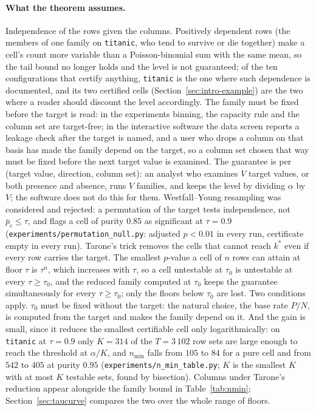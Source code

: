 \documentclass[11pt]{article}
\begin{document}
\paragraph{What the theorem assumes.} Independence of the rows given the columns. Positively dependent rows (the members of one family on \texttt{titanic}, who tend to survive or die together) make a cell's count more variable than a Poisson-binomial sum with the same mean, so the tail bound no longer holds and the level is not guaranteed; of the ten configurations that certify anything, \texttt{titanic} is the one where such dependence is documented, and its two certified cells (Section~\ref{sec:intro-example}) are the two where a reader should discount the level accordingly. The family must be fixed before the target is read: in the experiments binning, the capacity rule and the column set are target-free; in the interactive software the data screen reports a leakage check after the target is named, and a user who drops a column on that basis has made the family depend on the target, so a column set chosen that way must be fixed before the next target value is examined. The guarantee is per (target value, direction, column set): an analyst who examines $V$ target values, or both presence and absence, runs $V$ families, and keeps the level by dividing $\alpha$ by $V$; the software does not do this for them. Westfall--Young resampling was considered and rejected: a permutation of the target tests independence, not $\bar p_c\le\tau$, and flags a cell of purity $0.85$ as significant at $\tau=0.9$ (\texttt{experiments/permutation\_null.py}: adjusted $p<0.01$ in every run, certificate empty in every run). Tarone's trick removes the cells that cannot reach $k^*$ even if every row carries the target. The smallest $p$-value a cell of $n$ rows can attain at floor $\tau$ is $\tau^n$, which increases with $\tau$, so a cell untestable at $\tau_0$ is untestable at every $\tau\ge\tau_0$, and the reduced family computed at $\tau_0$ keeps the guarantee simultaneously for every $\tau\ge\tau_0$; only the floors below $\tau_0$ are lost. Two conditions apply. $\tau_0$ must be fixed without the target: the natural choice, the base rate $P/N$, is computed from the target and makes the family depend on it. And the gain is small, since it reduces the smallest certifiable cell only logarithmically: on \texttt{titanic} at $\tau=0.9$ only $K=314$ of the $T=3\,102$ row sets are large enough to reach the threshold at $\alpha/K$, and $n_{\min}$ falls from $105$ to $84$ for a pure cell and from $542$ to $405$ at purity $0.95$ (\texttt{experiments/n\_min\_table.py}; $K$ is the smallest $K$ with at most $K$ testable sets, found by bisection). Columns under Tarone's reduction appear alongside the family bound in Table~\ref{tab:nmin}; Section~\ref{sec:taucurve} compares the two over the whole range of floors.
\end{document}
